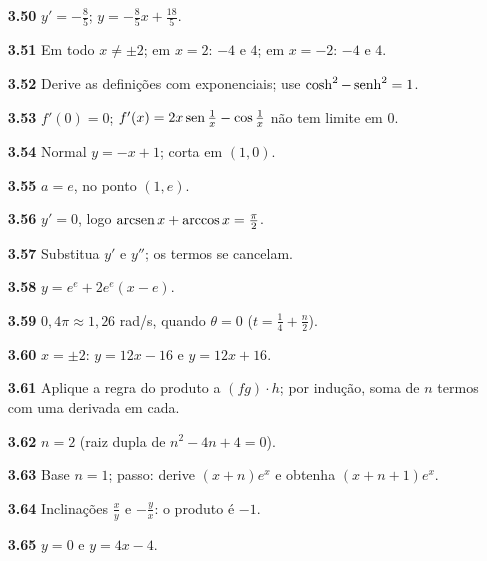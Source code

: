 {\begin{multicols}{2}
\begin{itemize}[leftmargin=2.7em,labelsep=0.5em,itemsep=1pt]
\item[\textbf{3.50}] $y'=-\tfrac85$; $y=-\tfrac85x+\tfrac{18}5$.
\item[\textbf{3.51}] Em todo $x\neq\pm2$; em $x=2$: $-4$ e $4$; em $x=-2$: $-4$ e $4$.
\item[\textbf{3.52}] Derive as definições com exponenciais; use $\cosh^2-\operatorname{senh}^2=1$.
\item[\textbf{3.53}] $f'(0)=0$; $f'(x)=2x\operatorname{sen}\tfrac1x-\cos\tfrac1x$ não tem limite em 0.
\item[\textbf{3.54}] Normal $y=-x+1$; corta em $(1,0)$.
\item[\textbf{3.55}] $a=e$, no ponto $(1,e)$.
\item[\textbf{3.56}] $y'=0$, logo $\operatorname{arcsen} x+\arccos x=\tfrac\pi2$.
\item[\textbf{3.57}] Substitua $y'$ e $y''$; os termos se cancelam.
\item[\textbf{3.58}] $y=e^e+2e^e(x-e)$.
\item[\textbf{3.59}] $0{,}4\pi\approx1{,}26$ rad/s, quando $\theta=0$ ($t=\tfrac14+\tfrac n2$).
\item[\textbf{3.60}] $x=\pm2$: $y=12x-16$ e $y=12x+16$.
\item[\textbf{3.61}] Aplique a regra do produto a $(fg)\cdot h$; por indução, soma de $n$ termos com uma derivada em cada.
\item[\textbf{3.62}] $n=2$ (raiz dupla de $n^2-4n+4=0$).
\item[\textbf{3.63}] Base $n=1$; passo: derive $(x+n)e^x$ e obtenha $(x+n+1)e^x$.
\item[\textbf{3.64}] Inclinações $\tfrac xy$ e $-\tfrac yx$: o produto é $-1$.
\item[\textbf{3.65}] $y=0$ e $y=4x-4$.
\end{itemize}\end{multicols}}
